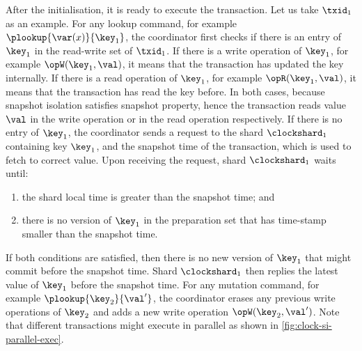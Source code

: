 After the initialisation, it is ready to execute the transaction.
Let us take \( \txid_1 \) as an example.
For any lookup command, for example \( \plookup{\var(x)}{\key_1}  \),
the coordinator first checks if there is an entry of \( \key_1 \) in the read-write set of \( \txid_1 \).
If there is a write operation of \( \key_1 \), for example \( \opW(\key_1,\val) \),
it means that the transaction has updated the key internally.
If there is a read operation of \( \key_1 \), for example \( \opR(\key_1,\val) \),
it means that the transaction has read the key before.
In both cases, because snapshot isolation satisfies snapshot property,
hence the transaction reads value \( \val \) 
in the write operation or in the read operation respectively.
If there is no entry of \( \key_1 \),
the coordinator sends a request to the shard \( \clockshard_1 \) containing key \( \key_1 \),
and the snapshot time of the transaction, which is used to fetch to correct value.
Upon receiving the request, shard \( \clockshard_1 \) waits until: 
\begin{enumerate}
\item the shard local time is greater than the snapshot time; and 
\item there is no version of \( \key_1 \) in the preparation set that has time-stamp smaller than the snapshot time.
\end{enumerate}
If both conditions are satisfied,
then there is no new version of \( \key_1 \) that might commit before the snapshot time.
Shard \( \clockshard_1 \) then replies the latest value of \( \key_1 \) before the snapshot time.
For any mutation command, for example \( \plookup{\key_2}{\val'}  \),
the coordinator erases any previous write operations of \( \key_2 \) and 
adds a new write operation \( \opW(\key_2, \val') \).
Note that different transactions might execute in parallel as shown in \cref{fig:clock-si-parallel-exec}.



